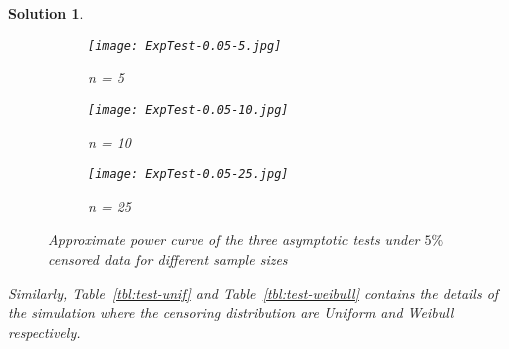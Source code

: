 \documentclass[12pt]{article}
\theoremstyle{problemstyle}
\newtheorem*{solution*}{Solution}
\begin{document}
\begin{solution*}
    \begin{figure}
        \centering
        \begin{subfigure}{0.75\textwidth}
            \texttt{[image: ExpTest-0.05-5.jpg]}
            \caption{n = 5}
        \end{subfigure}
        \begin{subfigure}{0.75\textwidth}
            \texttt{[image: ExpTest-0.05-10.jpg]}
            \caption{n = 10}
        \end{subfigure}
        \begin{subfigure}{0.75\textwidth}
            \texttt{[image: ExpTest-0.05-25.jpg]}
            \caption{n = 25}
        \end{subfigure}
        \caption{Approximate power curve of the three asymptotic tests under $5\%$ censored data for different sample sizes}
        \label{fig:1}
    \end{figure}

    Similarly, Table~\ref{tbl:test-unif} and Table~\ref{tbl:test-weibull} contains the details of the simulation where the censoring distribution are Uniform and Weibull respectively.


\end{solution*}
\end{document}
